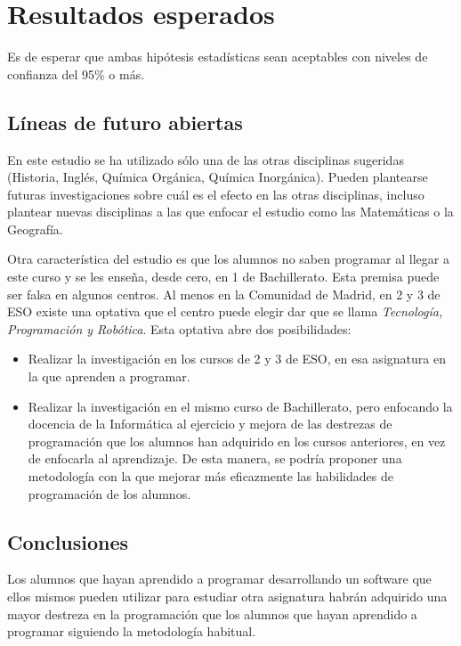 \documentclass[palatino,miniheader]{apuntesURJC}
\begin{document}
\chapter{Resultados esperados}

Es de esperar que ambas hipótesis estadísticas sean aceptables con niveles de confianza del 95\% o más.
%

\section{Líneas de futuro abiertas}

En este estudio se ha utilizado sólo una de las otras disciplinas sugeridas (Historia, Inglés, Química Orgánica, Química Inorgánica). 
%
Pueden plantearse futuras investigaciones sobre cuál es el efecto en las otras disciplinas, incluso plantear nuevas disciplinas a las que enfocar el estudio como las Matemáticas o la Geografía.

Otra característica del estudio es que los alumnos no saben programar al llegar a este curso y se les enseña, desde cero, en 1 de Bachillerato.
%
Esta premisa puede ser falsa en algunos centros. 
%
Al menos en la Comunidad de Madrid, en 2 y 3 de ESO existe una optativa que el centro puede elegir dar que se llama \textit{Tecnología, Programación y Robótica}. 
%
Esta optativa abre dos posibilidades:
\begin{itemize}
 	\item Realizar la investigación en los cursos de 2 y 3 de ESO, en esa asignatura en la que aprenden a programar.
 	\item Realizar la investigación en el mismo curso de Bachillerato, pero enfocando la docencia de la Informática al ejercicio y mejora de las destrezas de programación que los alumnos han adquirido en los cursos anteriores, en vez de enfocarla al aprendizaje.
 	De esta manera, se podría proponer una metodología con la que mejorar más eficazmente las habilidades de programación de los alumnos.
 \end{itemize} 

\section{Conclusiones}

Los alumnos que hayan aprendido a programar desarrollando un software que ellos mismos pueden utilizar para estudiar otra asignatura habrán adquirido una mayor destreza en la programación que los alumnos que hayan aprendido a programar siguiendo la metodología habitual.
\end{document}
